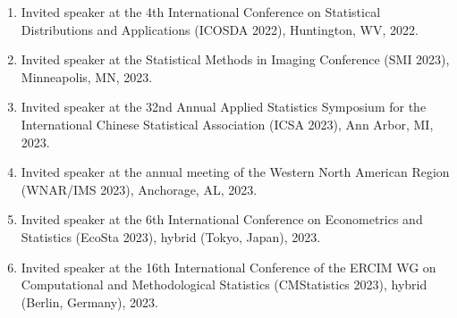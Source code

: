 \documentclass[12pt]{article}
\begin{document}
\begin{enumerate}
		\item Invited speaker at the 4th International Conference on 
		Statistical Distributions and Applications (ICOSDA 2022), 
		Huntington, WV, 2022. 
		
		\item Invited speaker at the Statistical Methods in Imaging 
		Conference (SMI 2023), Minneapolis, MN, 2023.
		
		\item Invited speaker at the 32nd Annual Applied Statistics 
		Symposium for the International Chinese Statistical 
		Association (ICSA 2023), Ann Arbor, MI, 2023.
		
		\item Invited speaker at the annual meeting of the Western 
		North American Region (WNAR/IMS 2023), Anchorage, AL, 2023.
		
		\item Invited speaker at the 6th International Conference on 
		Econometrics and Statistics (EcoSta 2023), hybrid (Tokyo, 
		Japan), 2023.
		
		\item Invited speaker at the 16th International Conference 
		of the ERCIM WG on Computational and Methodological 
		Statistics (CMStatistics 2023), hybrid (Berlin, Germany), 
		2023.		
	\end{enumerate}
	
\end{document}
